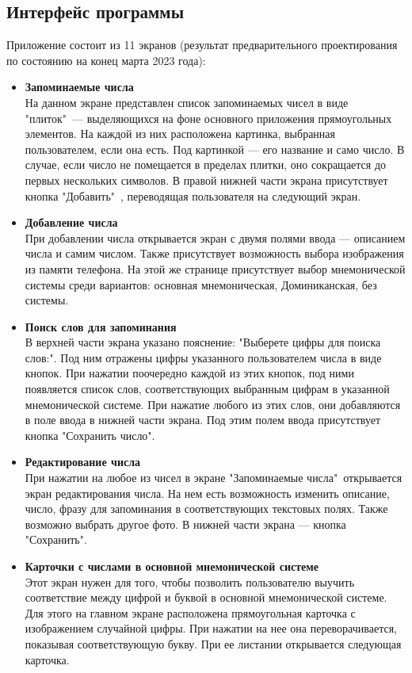 \documentclass[draft]{article}
\begin{document}
\subsection{Интерфейс программы}
Приложение состоит из 11 экранов (результат предварительного проектирования по состоянию на конец марта 2023 года):
\begin{itemize}
\item \textbf{Запоминаемые числа}\\
На данном экране представлен список запоминаемых чисел в виде "{}плиток"{}\ — выделяющихся на фоне основного приложения прямоугольных элементов. На каждой из них расположена картинка, выбранная пользователем, если она есть. Под картинкой — его название и само число. В случае, если число не помещается в пределах плитки, оно сокращается до первых нескольких символов. В правой нижней части экрана присутствует кнопка "{}Добавить"{}\ , переводящая пользователя на следующий экран.
\item \textbf{Добавление числа}\\
При добавлении числа открывается экран с двумя полями ввода — описанием числа и самим числом. Также присутствует возможность выбора изображения из памяти телефона. На этой же странице присутствует выбор мнемонической системы среди вариантов: основная мнемоническая, Доминиканская, без системы.
\item \textbf{Поиск слов для запоминания}\\
В верхней части экрана указано пояснение: "{}Выберете цифры для поиска слов:"{}. Под ним отражены цифры указанного пользователем числа в виде кнопок. При нажатии поочередно каждой из этих кнопок, под ними появляется список слов, соответствующих выбранным цифрам в указанной мнемонической системе. При нажатие любого из этих слов, они добавляются в поле ввода в нижней части экрана. Под этим полем ввода присутствует кнопка "{}Сохранить число"{}.
\item \textbf{Редактирование числа}\\
При нажатии на любое из чисел в экране "{}Запоминаемые числа"{}\ открывается экран редактирования числа. На нем есть возможность изменить описание, число, фразу для запоминания в соответствующих текстовых полях. Также возможно выбрать другое фото. В нижней части экрана — кнопка "{}Сохранить"{}.
\item \textbf{Карточки с числами в основной мнемонической системе}\\
Этот экран нужен для того, чтобы позволить пользователю выучить соответствие между цифрой и буквой в основной мнемонической системе. Для этого на главном экране расположена прямоугольная карточка с изображением случайной цифры. При нажатии на нее она переворачивается, показывая соответствующую букву. При ее листании открывается следующая карточка.

\end{itemize}
\end{document}
